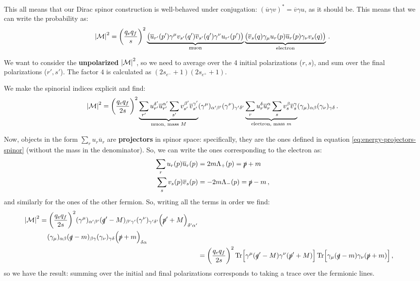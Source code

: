 \documentclass[main.tex]{subfiles}
\begin{document}
This all means that our Dirac spinor construction is well-behaved under conjugation: \((\overline{u} \gamma v)^{*} = \overline{v} \gamma u\), as it should be. 
This means that we can write the probability as: 
%
\begin{align}
\abs{\mathcal{M}}^2 = \qty(\frac{q_e q_f}{s})^2 
\underbrace{\qty(
\overline{u}_{r'}(p') \gamma^{\mu } v_{s'}(q') \overline{v}_{s'} (q') \gamma^{\nu } u_{r'}(p')
)}_{\text{muon}}
\underbrace{\qty(
\overline{v}_{s}(q) \gamma_{\mu} u_r (p) \overline{u}_{r}(p) \gamma_{\nu } v_s(q)
)}_{\text{electron}}
\,.
\end{align}

We want to consider the \textbf{unpolarized} \(\abs{\mathcal{M}}^2\), so we need to average over the 4 initial polarizations (\(r, s\)), and sum over the final polarizations (\(r', s'\)).
The factor \(4\) is calculated as \((2s_{e^{-}}+1) (2s_{e^{+}}+1)\). 

We make the spinorial indices explicit and find: 
%
\begin{align}
\abs{\mathcal{M}}^2 = 
\qty( \frac{q_e q_f}{2 s})^2 
\underbrace{\sum _{r'} u_{r'}^{ \delta'} \overline{u}^{\alpha '}_{r'}
\sum _{s'} v_{s'}^{ \beta'} \overline{v}^{\gamma '}_{s'}}_{\text{muon, mass }M}
(\gamma^{\mu })_{ \alpha ' \beta '}
(\gamma^{\nu })_{ \gamma ' \delta '}
\underbrace{\sum _{r} u_{r}^{ \delta} \overline{u}^{\alpha }_{r}
\sum _{s} v_{s}^{ \beta} \overline{v}^{\gamma }_{s}
}_{\text{electron, mass }m}
(\gamma_{\mu })_{ \alpha  \beta }
(\gamma_{\nu })_{ \gamma  \delta }
\,.
\end{align}

Now, objects in the form \(\sum _{r} u_r \overline{u}_{r}\) are \textbf{projectors} in spinor space: specifically, they are the ones defined in equation \eqref{eq:energy-projectors-spinor} (without the mass in the denominator). 
So, we can write the ones corresponding to the electron as: 
%
\begin{align}
\sum _{r} u_r (p) \overline{u}_r (p) &= 2 m \Lambda_{+} (p) = \slashed{p} + m \\
\sum _{s} v_s (p) \overline{v}_s (p) &= -2 m \Lambda_{-} (p) = \slashed{p} - m
\,,
\end{align}
%
and similarly for the ones of the other fermion.
So, writing all the terms in order we find: 
%
\begin{align}
\begin{split}
\abs{\mathcal{M}}^2 &= 
\qty( \frac{q_e q_f}{2 s})^2 
(\gamma^{\mu })_{ \alpha ' \beta '}
(\slashed{q}' - M)_{\beta ' \gamma '}
(\gamma^{\nu })_{ \gamma ' \delta '}
\qty(\slashed{p}' + M)_{ \delta ' \alpha '} \\
&\phantom{=}\ 
(\gamma_{\mu })_{ \alpha  \beta }
(\slashed{q} - m)_{\beta  \gamma }
(\gamma_{\nu })_{ \gamma  \delta }
\qty(\slashed{p} + m)_{ \delta  \alpha }
\end{split}  \\
&= 
\qty( \frac{q_e q_f}{2 s})^2 
\Tr [\gamma^{\mu } (\slashed{q}' - M) \gamma^{\nu } (\slashed{p}' + M)]
\Tr [\gamma_{\mu } (\slashed{q} - m) \gamma_{\nu } (\slashed{p} + m)]
\,,
\end{align}
%
so we have the result: summing over the initial and final polarizations corresponds to taking a trace over the fermionic lines. 
\end{document}
